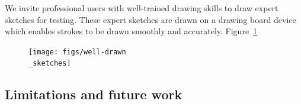 We invite professional users with well-trained drawing skills to draw expert sketches for testing. These expert sketches are drawn on a drawing board device which enables strokes to be drawn smoothly and accurately. Figure~\ref{fig:expert_sketches}

\begin{figure}
	\texttt{[image: figs/well-drawn\\\_sketches]}
	\caption{}
	\label{fig:expert_sketches}
\end{figure}

\subsection{Limitations and future work}

\